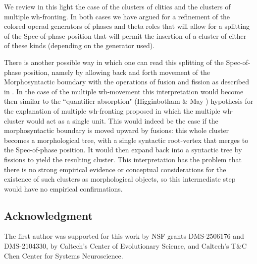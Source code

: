 \documentclass[12pt]{amsart}
\numberwithin{equation}{section}
\begin{document}
We review in this light the case of the clusters of clitics and the clusters of
multiple wh-fronting. In both cases we have argued for a refinement
of the colored operad generators of phases and theta roles that will
allow for a splitting of the Spec-of-phase position that will permit
the insertion of a cluster of either of these kinds (depending on the
generator used). 

There is another possible way in which one can read this splitting of
the Spec-of-phase position, namely by allowing back and forth movement 
of the Morphosyntactic boundary with the operations of fusion and fission
as described in \cite{SentMar}. In the case of the multiple wh-movement
this interpretation would become then similar to the ``quantifier absorption"
(Higginbotham \& May \cite{Higg}) hypothesis for the explanation of multiple 
wh-fronting proposed in which the multiple wh-cluster would act as a single
unit. This would indeed be the case if the morphosyntactic boundary
is moved upward by fusions: this whole cluster becomes a morphological tree, 
with a single syntactic root-vertex that merges to the Spec-of-phase position.
It would then expand back into a syntactic tree by fissions to yield the resulting
cluster. This interpretation has the problem that there is no strong empirical 
evidence or conceptual considerations for the existence of such clusters as
morphological objects, so this intermediate step would have no empirical
confirmations. 

\smallskip

\subsection*{Acknowledgment} The first author was supported for this work 
by NSF grants DMS-2506176 and DMS-2104330, by Caltech's  Center 
of Evolutionary Science, and Caltech’s T\&C Chen Center for Systems Neuroscience. 


\bigskip
\end{document}
